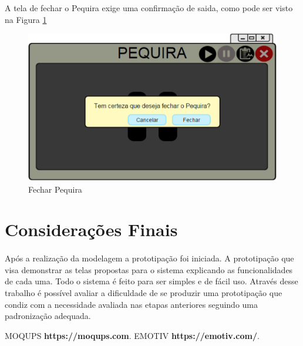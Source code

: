 \documentclass[12pt]{article}
\begin{document}
A tela de fechar o Pequira exige uma confirmação de saida, como pode ser visto na Figura \ref{fechar_pequira}

\begin{figure}[h]
\centering
\includegraphics[scale=0.5]{imagens2/4-1FecharPequira.pdf}
\caption{Fechar Pequira}
\label{fechar_pequira}
\end{figure}

\section{Considerações Finais}
\paragraph{} Após a realização da modelagem a prototipação foi iniciada. A prototipação que visa demonstrar as telas propostas para o sistema explicando as funcionalidades de cada uma. Todo o sistema é feito para ser simples e de fácil uso. Através desse trabalho é possível avaliar a dificuldade de se produzir uma prototipação que condiz com a necessidade avaliada nas etapas anteriores seguindo uma padronização adequada.


\begin{thebibliography}{}                  
 MOQUPS \textbf{https://moqups.com}.
 EMOTIV \textbf{https://emotiv.com/}.
\end{thebibliography}     
\end{document}
